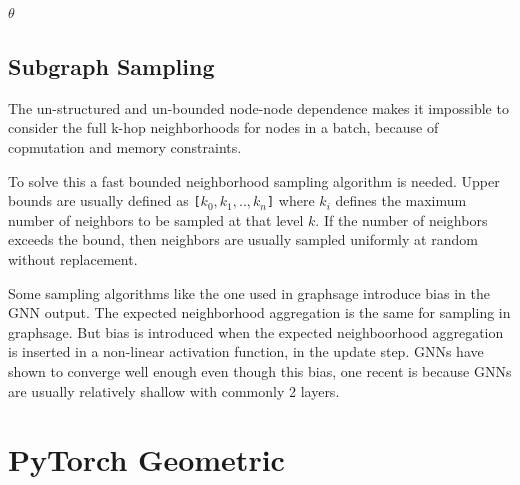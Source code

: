 \begin{algorithm}[H]
\label{algo:sampling}
\footnotesize
\caption{Mini-batch GNN Training (Single Epoch)}
\DontPrintSemicolon
{}
\KwOut{$\theta$}
\Return $\theta$\;
\end{algorithm}


\subsection{Subgraph Sampling}\label{sec:subgraph_sampling}

The un-structured and un-bounded node-node dependence makes it impossible to consider the full k-hop neighborhoods for nodes in a batch, because of copmutation and memory constraints.

To solve this a fast bounded neighborhood sampling algorithm is needed. Upper bounds are usually defined as \texttt{[$k_0, k_1,..,k_n$]} where $k_i$ defines the maximum number of neighbors to be sampled at that level $k$. If the number of neighbors exceeds the bound, then neighbors are usually sampled uniformly at random without replacement.

Some sampling algorithms like the one used in graphsage introduce bias in the GNN output. The expected neighborhood aggregation is the same for sampling in graphsage. But bias is introduced when the expected neighboorhood aggregation is inserted in a non-linear activation function, in the update step. GNNs have shown to converge well enough even though this bias, one recent is because GNNs are usually relatively shallow with commonly 2 layers.


\section{PyTorch Geometric}\label{sec:pyg}

